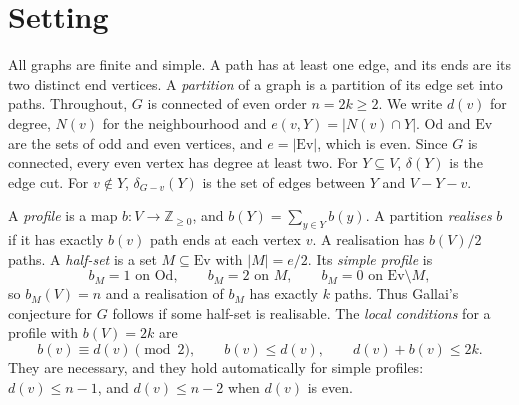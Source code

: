 \documentclass[11pt]{amsart}
\theoremstyle{definition}
\newcommand{\Ev}{\mathrm{Ev}}
\newcommand{\Od}{\mathrm{Od}}
\begin{document}
\begin{abstract}
\begin{itemize}
multigraphs whose Hamiltonian decompositions all pair the edges at one vertex in the same way.
\begin{itemize}
\item There is a non-realisable cut-feasible half-set of order $18$ and minimum degree $3$.
\item For every $r\ge2$ there are $2r$-edge-connected examples of minimum degree $2r$.
\item Hardness holds for $4$-edge-connected graphs whose degrees are all even and at least $4$.
\end{itemize}
\item \emph{Matroid structure.} For each vertex, the half-sets meeting its inequalities are the bases
of a matroid. The cut-feasible family is the intersection of these matroids, and is not a matroid in
general. In cones it is described exactly by edge-disjoint pairings avoiding the apex.
\end{itemize}
We also restate several results of the archive as cut statements and discuss related work.
\end{abstract}
\maketitle

\section{Setting}\label{sec:setting}

All graphs are finite and simple. A path has at least one edge, and its ends are its two distinct end
vertices. A \emph{partition} of a graph is a partition of its edge set into paths. Throughout, $G$ is
connected of even order $n=2k\ge 2$. We write $d(v)$ for degree, $N(v)$ for the neighbourhood and
$e(v,Y)=|N(v)\cap Y|$. $\Od$ and $\Ev$ are the sets of odd and even vertices, and $e=|\Ev|$, which is
even. Since $G$ is connected, every even vertex has degree at least two. For $Y\subseteq V$,
$\delta(Y)$ is the edge cut. For $v\notin Y$, $\delta_{G-v}(Y)$ is the set of edges between $Y$ and
$V-Y-v$.

A \emph{profile} is a map $b:V\to\mathbb Z_{\ge 0}$, and $b(Y)=\sum_{y\in Y}b(y)$. A partition
\emph{realises} $b$ if it has exactly $b(v)$ path ends at each vertex $v$. A realisation has $b(V)/2$
paths. A \emph{half-set} is a set $M\subseteq\Ev$ with $|M|=e/2$. Its \emph{simple profile} is
\[
b_M=1 \text{ on }\Od,\qquad b_M=2\text{ on }M,\qquad b_M=0\text{ on }\Ev\setminus M,
\]
so $b_M(V)=n$ and a realisation of $b_M$ has exactly $k$ paths. Thus Gallai's conjecture for $G$
follows if some half-set is realisable. The \emph{local conditions} for a profile with $b(V)=2k$ are
\[
b(v)\equiv d(v)\pmod 2,\qquad b(v)\le d(v),\qquad d(v)+b(v)\le 2k .
\]
They are necessary, and they hold automatically for simple profiles: $d(v)\le n-1$, and
$d(v)\le n-2$ when $d(v)$ is even.
\end{document}
